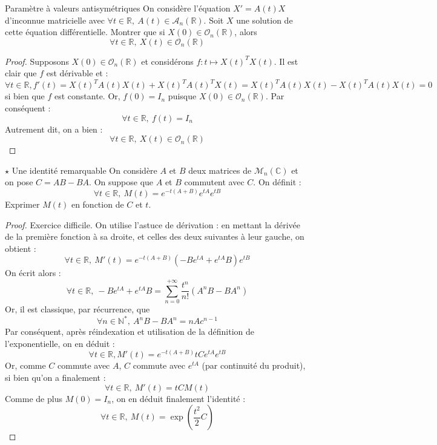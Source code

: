 \documentclass[french,a4paper]{article}
\newcommand{\N}{\mathbb{N}}
\newcommand{\R}{\mathbb{R}}
\newcommand{\C}{\mathbb{C}}
\newcommand{\st}{^*}
\theoremstyle{plain}
\theoremstyle{definition}
\theoremstyle{remark}
\begin{document}
\begin{ex}{Paramètre à valeurs antisymétriques}
	On considère l'équation $X'=A(t)X$ d'inconnue matricielle avec $\forall t\in\R,\ A(t)\in\mathcal{A}_n(\R)$. Soit $X$ une solution de cette équation différentielle. Montrer que si $X(0)\in\mathcal{O}_n(\R)$, alors $$\forall t\in\R,\ X(t)\in\mathcal{O}_n(\R)$$
\end{ex}
\begin{proof}
	Supposons $X(0)\in\mathcal{O}_n(\R)$ et considérons $f:t\mapsto X(t)^TX(t)$. Il est clair que $f$ est dérivable et : $$\forall t\in\R, f'(t)=X(t)^TA(t)X(t)+X(t)^TA(t)^TX(t)=X(t)^TA(t)X(t)-X(t)^TA(t)X(t)=0$$ si bien que $f$ est constante. Or, $f(0)=I_n$ puisque $X(0)\in\mathcal{O}_n(\R)$. Par conséquent : $$\forall t\in\R,\ f(t)=I_n$$ Autrement dit, on a bien : $$\forall t\in\R,\ X(t)\in\mathcal{O}_n(\R)$$
\end{proof}

\begin{ex}{$\star$ Une identité remarquable}
	On considère $A$ et $B$ deux matrices de $\mathcal{M}_n(\C)$ et on pose $C=AB-BA$. On suppose que $A$ et $B$ commutent avec $C$. On définit : $$\forall t\in\R,\ M(t)=e^{-t(A+B)}e^{tA}e^{tB}$$ Exprimer $M(t)$ en fonction de $C$ et $t$.
\end{ex}
\begin{proof}
	Exercice difficile. On utilise l'astuce de dérivation : en mettant la dérivée de la première fonction à sa droite, et celles des deux suivantes à leur gauche, on obtient : $$\forall t\in\R,\ M'(t)=e^{-t(A+B)}\left(-Be^{tA}+e^{tA}B\right)e^{tB}$$ On écrit alors : $$\forall t\in\R,\ -Be^{tA}+e^{tA}B=\sum_{n=0}^{+\infty}\frac{t^n}{n!}(A^nB-BA^n)$$ Or, il est classique, par récurrence, que $$\forall n\in\N\st,\ A^nB-BA^n=nAc^{n-1}$$ Par conséquent, après réindexation et utilisation de la définition de l'exponentielle, on en déduit : $$\forall t\in\R, M'(t)=e^{-t(A+B)}tCe^{tA}e^{tB}$$ Or, comme $C$ commute avec $A$, $C$ commute avec $e^{tA}$ (par continuité du produit), si bien qu'on a finalement : $$\forall t\in\R,\ M'(t)=tCM(t)$$ Comme de plus $M(0)=I_n$, on en déduit finalement l'identité : $$\forall t\in\R,\ M(t)=\exp\left(\frac{t^2}{2}C\right)$$ 
\end{proof}
\end{document}
